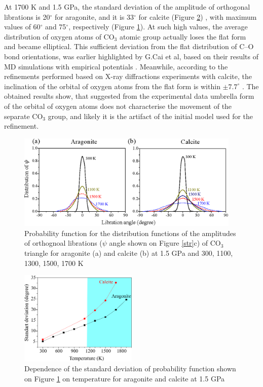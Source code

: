 \documentclass[journal=jacsat,manuscript=article]{achemso}
\begin{document}
 At 1700 K and 1.5 GPa, the standard deviation of the amplitude of orthogonal librations is 20$^{\circ}$ for aragonite, and it is 33$^{\circ}$ for calcite (Figure \ref{libr15_d}) , with maximum values of 60$^{\circ}$ and 75$^{\circ}$, respectively (Figure \ref{libr15}). 
 At such high values, the average distribution of oxygen atoms of CO$_3$ atomic group actually loses the flat form and became elliptical.
This sufficient deviation from the flat distribution of C--O bond orientations, was earlier highlighted by G.Cai et al, based on their results of MD simulations with empirical potentials \cite{cai2020}.
Meanwhile, according to the refinements performed based on X-ray diffractions experiments with calcite, the inclination of the orbital of oxygen atoms from the flat form is within $\pm 7.7^\circ$  \cite{ishizawa2013}.
The obtained results show, that suggested from the experimental data umbrella form of the orbital of oxygen atoms does not characterise the movement of the separate CO$_3$ group, and likely it is the artifact of the initial model used for the refinement.


\begin{figure}[H]
\includegraphics[width=0.95\textwidth]{libr15} \centering
\caption{Probability function for the distribution functions of the amplitudes of orthognoal librations  ($\psi$  angle shown on Figure \ref{str}c) of CO$_3$ triangle for aragonite (a) and calcite (b) at 1.5 GPa and 300, 1100, 1300, 1500, 1700 K} \label{libr15}
\end{figure}

\begin{figure}[H]
\includegraphics[width=0.5\textwidth]{libr15_d} \centering
\caption{Dependence of the standard deviation of probability function shown on Figure \ref{libr15} on temperature  for aragonite and calcite at 1.5 GPa} \label{libr15_d}
\end{figure}
\end{document}
